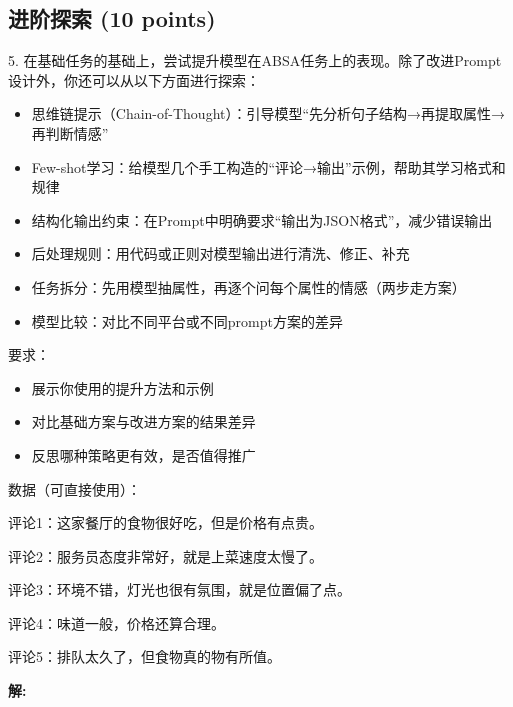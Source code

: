 \documentclass[8pt]{article}
\begin{document}
\subsection*{进阶探索 (10 points)}
5. 在基础任务的基础上，尝试提升模型在ABSA任务上的表现。除了改进Prompt设计外，你还可以从以下方面进行探索：
\begin{itemize}
    \item 思维链提示（Chain-of-Thought）：引导模型“先分析句子结构→再提取属性→再判断情感”
    \item Few-shot学习：给模型几个手工构造的“评论→输出”示例，帮助其学习格式和规律
    \item 结构化输出约束：在Prompt中明确要求“输出为JSON格式”，减少错误输出
    \item 后处理规则：用代码或正则对模型输出进行清洗、修正、补充
    \item 任务拆分：先用模型抽属性，再逐个问每个属性的情感（两步走方案）
    \item 模型比较：对比不同平台或不同prompt方案的差异
\end{itemize}
要求：
\begin{itemize}
    \item 展示你使用的提升方法和示例
    \item 对比基础方案与改进方案的结果差异
    \item 反思哪种策略更有效，是否值得推广
\end{itemize}


数据（可直接使用）：

评论1：这家餐厅的食物很好吃，但是价格有点贵。  

评论2：服务员态度非常好，就是上菜速度太慢了。  

评论3：环境不错，灯光也很有氛围，就是位置偏了点。  

评论4：味道一般，价格还算合理。  

评论5：排队太久了，但食物真的物有所值。

\textbf{\large 解:}

\vspace{8em}

\par
\end{document}
